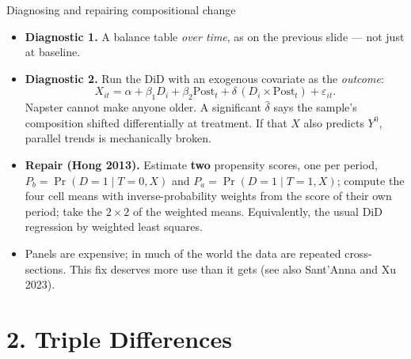 \documentclass[
  11pt,
  ignorenonframetext,
  aspectratio=169,
]{beamer}
\providecommand{\tightlist}{%
  \setlength{\itemsep}{0pt}\setlength{\parskip}{0pt}}
\begin{document}
\begin{frame}{Diagnosing and repairing compositional change}
\protect{}\label{diagnosing-and-repairing-compositional-change}
\begin{itemize}
\tightlist
\item
  \textbf{Diagnostic 1.} A balance table \emph{over time}, as on the
  previous slide --- not just at baseline.
\item
  \textbf{Diagnostic 2.} Run the DiD with an exogenous covariate as the
  \emph{outcome}: \[
  X_{it} = \alpha + \beta_1 D_i + \beta_2 \text{Post}_t + \delta\,(D_i \times \text{Post}_t) + \varepsilon_{it}.
  \] Napster cannot make anyone older. A significant \(\hat\delta\) says
  the sample's composition shifted differentially at treatment. If that
  \(X\) also predicts \(Y^0\), parallel trends is mechanically broken.
\end{itemize}

\vspace{0.3em}

\begin{itemize}
\tightlist
\item
  \textbf{Repair (Hong 2013).} Estimate \textbf{two} propensity scores,
  one per period, \(P_b = \Pr(D=1 \mid T=0, X)\) and
  \(P_a = \Pr(D=1 \mid T=1, X)\); compute the four cell means with
  inverse-probability weights from the score of their own period; take
  the \(2 \times 2\) of the weighted means. Equivalently, the usual DiD
  regression by weighted least squares.
\item
  Panels are expensive; in much of the world the data are repeated
  cross-sections. This fix deserves more use than it gets (see also
  Sant'Anna and Xu 2023).
\end{itemize}
\end{frame}

\section{2. Triple Differences}\label{triple-differences}
\end{document}
